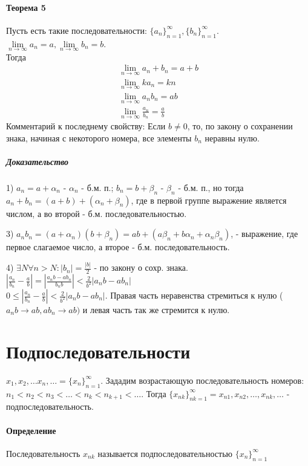 \documentclass[10pt]{article}
\newcommand{\limninf}{\lim\limits_{n \to \infty}}
\newcommand{\seq}[2]{ \{#1_{#2}\}_{#2=1}^\infty}
\newcommand{\seqn}[1]{\seq{#1}{n}}
\begin{document}
			\paragraph{Теорема 5}
			Пусть есть такие последовательности: $\seqn{a}, \seqn{b}$. $\limninf a_n = a, \limninf b_n = b$.\\
			Тогда 
			\begin{eqnarray}
				\limninf a_n + b_n = a + b\\
				\limninf ka_n = kn\\
				\limninf a_n b_n = ab\\
				\limninf \frac{a_n}{b_n} = \frac{a}{b}
			\end{eqnarray}
			Комментарий к последнему свойству: Если $b \neq 0$, то, по закону о сохранении знака, начиная с некоторого номера, все элементы $b_n$ неравны нулю.
			\subparagraph{Доказательство}
			1) $a_n = a + \alpha_n$ - $\alpha_n$ - б.м. п.; $b_n = b + \beta_n$ - $\beta_n$ - б.м. п., но тогда\\
			$a_n  + b_n = (a + b) + (\alpha_n + \beta_n)$, где в первой группе выражение является числом, а во второй - б.м. последовательностью.
			
			3) $a_n b_n = (a+\alpha_n)(b+\beta_n) = ab + (a\beta_n + b\alpha_n + \alpha_n\beta_n)$, - выражение, где первое слагаемое число, а второе - б.м. последовательность. 
			
			4) $\exists N \forall n > N : |b_n| = \frac{|b|}{2}$ - по закону о сохр. знака.\\
			$|\frac{a_n}{b_n} - \frac{a}{b}| = |\frac{a_nb - ab_n}{b_nb}| < \frac{2}{b^2}|a_nb - ab_n|$\\
			$0 \le |\frac{a_n}{b_n} - \frac{a}{b}| < \frac{2}{b^2}|a_nb - ab_n|$. Правая часть неравенства стремиться к нулю ($a_nb \to ab, ab_n \to ab)$ и левая часть так же стремится к нулю.
	\section{Подпоследовательности}
		$x_1,x_2, \dots x_n, \dots = \seqn{x}$. Зададим возрастающую последовательность номеров: $n_1 < n_2 < n_3 < \dots < n_k < n_{k+1} < \dots$. Тогда $\seq{x}{nk} = x_{n1}, x_{n2}, \dots, x_{nk}, \dots$ - подпоследовательность.
		
		\paragraph{Определение} Последовательность $x_{nk}$ называется подпоследовательностью $\seqn{x}$
		
\end{document}
